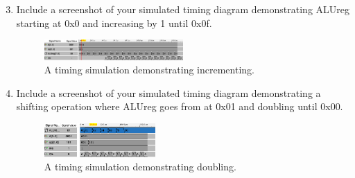 \documentclass{article}
\begin{document}
\begin{enumerate}
\setcounter{enumi}{2}
\item Include a screenshot of your simulated timing diagram demonstrating ALUreg starting at 0x0 and increasing by 1 until 0x0f.

\begin{figure}[ht!]
    \centering
    \includegraphics[width=0.5\textwidth]{lab4_timing_plus_one.png}
    \caption{A timing simulation demonstrating incrementing.}
    \label{f:timing_plus_one}
\end{figure}

\item Include a screenshot of your simulated timing diagram demonstrating a shifting operation where ALUreg goes from at 0x01 and doubling until 0x00.

\begin{figure}[ht!]
    \centering
    \includegraphics[width=0.4\textwidth]{lab4_timing_times_two.png}
    \caption{A timing simulation demonstrating doubling.}
    \label{f:timing_double}
\end{figure}
\end{enumerate}
\newpage
\end{document}
